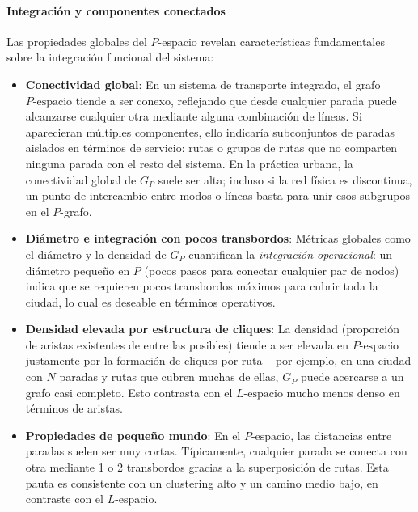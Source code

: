             \paragraph{Integración y componentes conectados}
                Las propiedades globales del $P\text{-espacio}$ revelan características fundamentales sobre la integración funcional del sistema:

                \begin{itemize}
                    \item \textbf{Conectividad global}: En un sistema de transporte integrado, el grafo $P\text{-espacio}$ tiende a ser conexo, reflejando que desde cualquier parada puede alcanzarse cualquier otra mediante alguna combinación de líneas. Si aparecieran múltiples componentes, ello indicaría subconjuntos de paradas aislados en términos de servicio: rutas o grupos de rutas que no comparten ninguna parada con el resto del sistema. En la práctica urbana, la conectividad global de $G_P$ suele ser alta; incluso si la red física es discontinua, un punto de intercambio entre modos o líneas basta para unir esos subgrupos en el $P$-grafo.

                    \item \textbf{Diámetro e integración con pocos transbordos}: Métricas globales como el diámetro y la densidad de $G_P$ cuantifican la \textit{integración operacional}: un diámetro pequeño en $P$ (pocos pasos para conectar cualquier par de nodos) indica que se requieren pocos transbordos máximos para cubrir toda la ciudad, lo cual es deseable en términos operativos.

                    \item \textbf{Densidad elevada por estructura de cliques}: La densidad (proporción de aristas existentes de entre las posibles) tiende a ser elevada en $P\text{-espacio}$ justamente por la formación de cliques por ruta – por ejemplo, en una ciudad con $N$ paradas y rutas que cubren muchas de ellas, $G_P$ puede acercarse a un grafo casi completo. Esto contrasta con el $L\text{-espacio}$ mucho menos denso en términos de aristas.

                    \item \textbf{Propiedades de pequeño mundo}: En el $P\text{-espacio}$, las distancias entre paradas suelen ser muy cortas. Típicamente, cualquier parada se conecta con otra mediante 1 o 2 transbordos gracias a la superposición de rutas. Esta pauta es consistente con un clustering alto y un camino medio bajo, en contraste con el $L\text{-espacio}$.
                \end{itemize}

